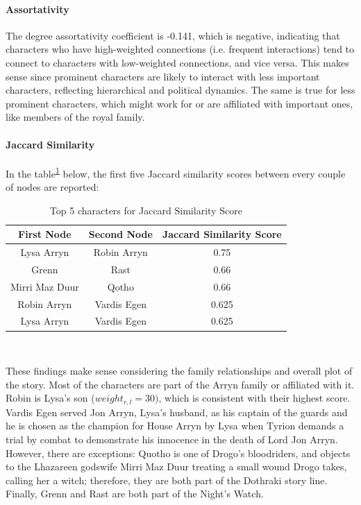 \documentclass[10pt,twocolumn,letterpaper]{article}
\begin{document}
\paragraph{Assortativity}

The degree assortativity coefficient is -0.141, which is negative, indicating that characters who have high-weighted connections (i.e. frequent interactions) tend to connect to characters with low-weighted connections, and vice versa. This makes sense since prominent characters are likely to interact with less important characters, reflecting hierarchical and political dynamics. The same is true for less prominent characters, which might work for or are affiliated with important ones, like members of the royal family.

\paragraph{Jaccard Similarity}

In the table\textsuperscript{\ref{tab:jac_s1}} below, the first five Jaccard similarity scores between every couple of nodes are reported: \\

\begin{table}[!h]
    \centering
    \small
    \begin{tabular}{c|c|c}
        First Node & Second Node & \small{Jaccard Similarity Score}  \\
        \hline
        Lysa Arryn & Robin Arryn & 0.75 \\
        Grenn & Rast & 0.66 \\
        Mirri Maz Duur & Qotho & 0.66 \\
        Robin Arryn & Vardis Egen & 0.625 \\
        Lysa Arryn & Vardis Egen & 0.625 \\     
        \hline 
    \end{tabular} \\
    \caption{Top 5 characters for Jaccard Similarity Score}
    \label{tab:jac_s1}
\end{table}

These findings make sense considering the family relationships and overall plot of the story. Most of the characters are part of the Arryn family or affiliated with it. Robin is Lysa's son ($weight_{r,l}=30)$, which is consistent with their highest score. Vardis Egen served Jon Arryn, Lysa's husband, as his captain of the guards and he is chosen as the champion for House Arryn by Lysa when Tyrion demands a trial by combat to demonstrate his innocence in the death of Lord Jon Arryn. 
However, there are exceptions: Quotho is one of Drogo's bloodriders, and objects to the Lhazareen godswife Mirri Maz Duur treating a small wound Drogo takes, calling her a witch; therefore, they are both part of the Dothraki story line. Finally, Grenn and Rast are both part of the Night's Watch.
\end{document}
